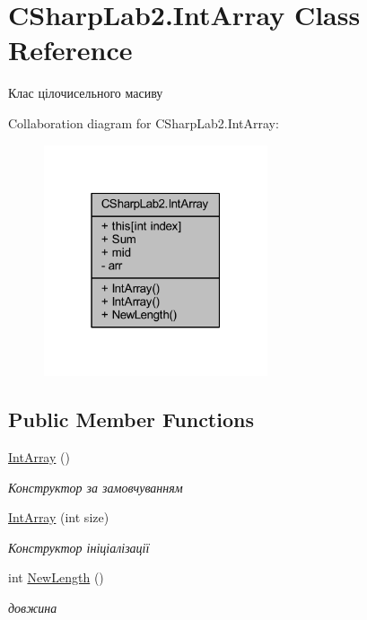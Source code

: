 \hypertarget{class_c_sharp_lab2_1_1_int_array}{}\section{C\+Sharp\+Lab2.\+Int\+Array Class Reference}
\label{class_c_sharp_lab2_1_1_int_array}


Клас цілочисельного масиву  




Collaboration diagram for C\+Sharp\+Lab2.\+Int\+Array\+:
\nopagebreak
\begin{figure}[H]
\begin{center}
\leavevmode
\includegraphics[width=187pt]{class_c_sharp_lab2_1_1_int_array__coll__graph}
\end{center}
\end{figure}
\subsection*{Public Member Functions}
\begin{DoxyCompactItemize}
\item 
\hyperlink{class_c_sharp_lab2_1_1_int_array_a3fe8a5d200583c1c345b4af4e14024be}{Int\+Array} ()
\begin{DoxyCompactList}\small\item\em Конструктор за замовчуванням \end{DoxyCompactList}\item 
\hyperlink{class_c_sharp_lab2_1_1_int_array_acc7eb5c0179289e1d64e791ee0ee5cce}{Int\+Array} (int size)
\begin{DoxyCompactList}\small\item\em Конструктор ініціалізації \end{DoxyCompactList}\item 
int \hyperlink{class_c_sharp_lab2_1_1_int_array_abe62d3588deef8d7e98ed5b3fd18e6fb}{New\+Length} ()
\begin{DoxyCompactList}\small\item\em довжина \end{DoxyCompactList}\end{DoxyCompactItemize}

